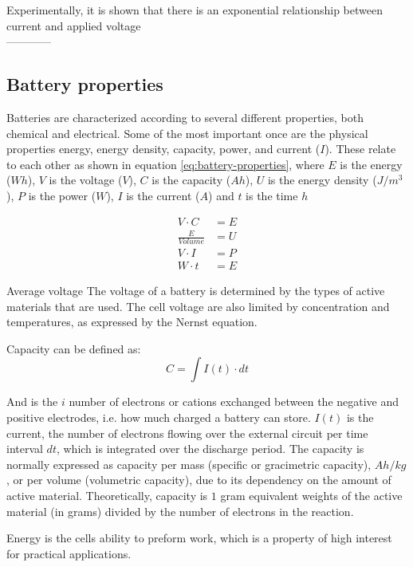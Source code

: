 	Experimentally, it is shown that there is an exponential relationship between current and applied voltage \\
------------
\subsection{Battery properties}\label{sec:battery-properties}

Batteries are characterized according to several different properties, both chemical and electrical. Some of the most important once are the physical properties energy, energy density, capacity, power, and current ($I$). These relate to each other as shown in equation \ref{eq:battery-properties}, where $E$ is the energy ($\si{Wh}$), $V$ is the voltage ($\si{V}$), $C$ is the capacity ($\si{Ah}$), $U$ is the energy density ($\si{J/m^3}$), $P$ is the power ($\si{W}$), $I$ is the current ($\si{A}$) and $t$ is the time $\si{h}$

\begin{align}\label{eq:battery-properties}
V \cdot C &= E \\
\frac{E}{Volume} &= U  \\
V \cdot I &= P \\
W \cdot t &= E 
\end{align}

Average voltage
The voltage of a battery is determined by the types of active materials that are used. The cell voltage are also limited by concentration and temperatures, as expressed by the Nernst equation. 

Capacity can be defined as:
	\begin{equation}
	C = \int I(t)\cdot dt
	\end{equation}
	
	And is the $i$ number of electrons or cations exchanged between the negative and positive electrodes, i.e. how much charged a battery can store. $I(t)$ is the current, the number of electrons flowing over the external circuit per time interval $dt$, which is integrated over the discharge period. The capacity is normally expressed as capacity per mass (specific or gracimetric capacity), $\si{Ah/kg}$, or per volume (volumetric capacity), due to its dependency on the amount of active material. Theoretically, capacity is $1$ gram equivalent weights of the active material (in grams) divided by the number of electrons in the reaction.
	
	Energy is the cells ability to preform work, which is a property of high interest for practical applications. 
		
